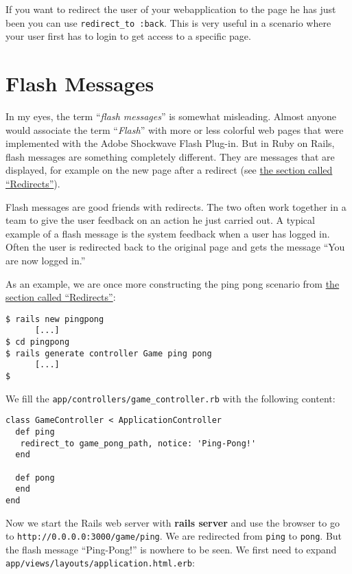 \documentclass[a4paper]{book}
\begin{document}
If you want to redirect the user of your webapplication to the page he has just been you can use \texttt{redirect\_to :back}. This is very useful in a scenario where your user first has to login to get access to a specific page.

\section{Flash Messages}\label{flash-messages}

In my eyes, the term “\emph{flash messages}” is somewhat misleading. Almost anyone would associate the term “\emph{Flash}” with more or less colorful web pages that were implemented with the Adobe Shockwave Flash Plug-in. But in Ruby on Rails, flash messages are something completely different. They are messages that are displayed, for example on the new page after a redirect (see \hyperref[redirects]{the section called “Redirects”}).

Flash messages are good friends with redirects. The two often work together in a team to give the user feedback on an action he just carried out. A typical example of a flash message is the system feedback when a user has logged in. Often the user is redirected back to the original page and gets the message “You are now logged in.”

As an example, we are once more constructing the ping pong scenario from \hyperref[redirects]{the section called “Redirects”}:

\begin{shaded}\begin{verbatim}
$ rails new pingpong
      [...]
$ cd pingpong
$ rails generate controller Game ping pong
      [...]
$
\end{verbatim}\end{shaded}

We fill the \texttt{app/controllers/game\_controller.rb} with the following content:

\begin{shaded}\begin{verbatim}
class GameController < ApplicationController
  def ping
   redirect_to game_pong_path, notice: 'Ping-Pong!'
  end

  def pong
  end
end
\end{verbatim}\end{shaded}

Now we start the Rails web server with \textbf{rails server} and use the browser to go to \texttt{http://0.0.0.0:3000/game/ping}. We are redirected from \texttt{ping} to \texttt{pong}. But the flash message “Ping-Pong!” is nowhere to be seen. We first need to expand \texttt{app/views/layouts/application.html.erb}:
\end{document}
